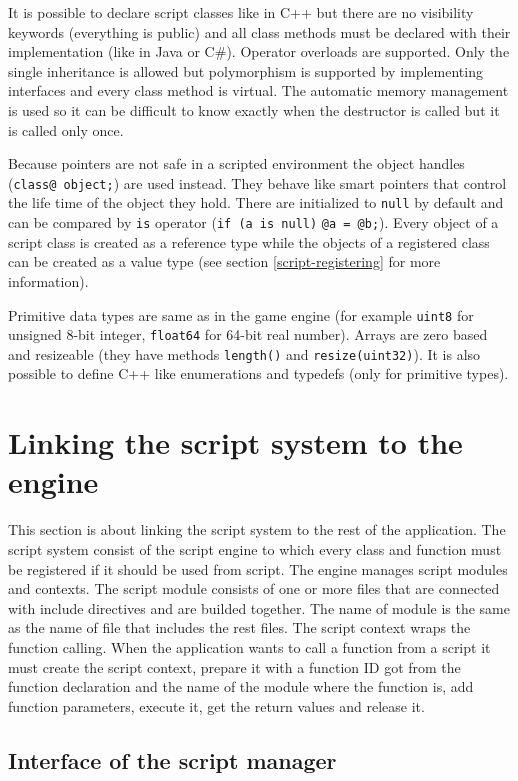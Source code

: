 It is possible to declare script classes like in C++ but there are no visibility keywords (everything is public) and all class methods must be declared with their implementation (like in Java or C\#). Operator overloads are supported. Only the single inheritance is allowed but polymorphism is supported by implementing interfaces and every class method is virtual. The automatic memory management is used so it can be difficult to know exactly when the destructor is called but it is called only once.

Because pointers are not safe in a scripted environment the object handles (\verb/class@ object;/) are used instead. They behave like smart pointers that control the life time of the object they hold. There are initialized to \verb/null/ by default and can be compared by \verb/is/ operator (\verb/if (a is null)/ \verb/@a = @b;/). Every object of a script class is created as a reference type while the objects of a registered class can be created as a value type (see section \ref{script-registering} for more information).

Primitive data types are same as in the game engine (for example \verb/uint8/ for unsigned 8-bit integer, \verb/float64/ for 64-bit real number). Arrays are zero based and resizeable (they have methods \verb/length()/ and \verb/resize(uint32)/). It is also possible to define C++ like enumerations and typedefs (only for primitive types).

\section{Linking the script system to the engine}

This section is about linking the script system to the rest of the application. The script system consist of the script engine to which every class and function must be registered if it should be used from script. The engine manages script modules and contexts. The script module consists of one or more files that are connected with include directives and are builded together. The name of module is the same as the name of file that includes the rest files. The script context wraps the function calling. When the application wants to call a function from a script it must create the script context, prepare it with a function ID got from the function declaration and the name of the module where the function is, add function parameters, execute it, get the return values and release it.

\subsection{Interface of the script manager}

